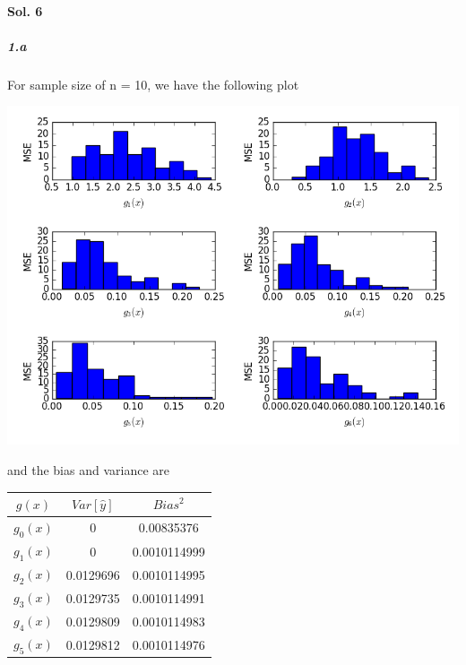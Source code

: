 \documentclass[]{report}
\begin{document}
\paragraph{Sol. 6}
\subparagraph{1.a}
	For sample size of n = 10, we have the following plot
	\begin{center}
		\includegraphics[width=\textwidth]{fig_10_MSE}
	\end{center}
	and the bias and variance are

	\begin{center}
		\begin{tabular}{c|c|c}
		\hline
		 $g(x)$     &   $Var[\hat{y}]$ &   ${Bias}^2$ \\
		\hline
		 $g_0 (x)$ &      0           & 0.00835376 \\
		 $g_1 (x)$ &      0 		  & 0.0010114999 \\
		 $g_2 (x)$ &      0.0129696   & 0.0010114995 \\
		 $g_3 (x)$ &      0.0129735   & 0.0010114991 \\
		 $g_4 (x)$ &      0.0129809   & 0.0010114983 \\
		 $g_5 (x)$ &      0.0129812   & 0.0010114976 \\
		\hline
		\end{tabular}
	\end{center}
\end{document}
